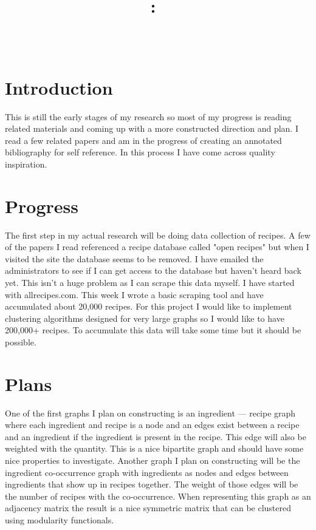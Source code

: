 \documentclass{article}
\title{
    \vspace{2in}
    \textmd{\textbf{\hmwkClass:\ \hmwkTitle}}\\
    \normalsize\vspace{0.1in}\small{\hmwkDueDate}\\
    \vspace{0.1in}\large{\textit{\hmwkClassInstructor}}
    \vspace{3in}
}
\author{\hmwkAuthorName}
\date{}
\begin{document}
\maketitle
\pagebreak

\section{Introduction}
This is still the early stages of my research so most of my progress is reading related materials and coming up with a more constructed direction and plan. I read a few related papers and am in the progress of creating an annotated bibliography for self reference. In this process I have come across quality inspiration.

\section{Progress}
The first step in my actual research will be doing data collection of recipes. A few of the papers I read referenced a recipe database called "open recipes" but when I visited the site the database seems to be removed. I have emailed the administrators to see if I can get access to the database but haven't heard back yet. This isn't a huge problem as I can scrape this data myself. I have started with allrecipes.com. This week I wrote a basic scraping tool and have accumulated about 20,000 recipes. For this project I would like to implement clustering algorithms designed for very large graphs so I would like to have 200,000+ recipes. To accumulate this data will take some time but it should be possible.

\section{Plans}
One of the first graphs I plan on constructing is an ingredient --- recipe graph where each ingredient and recipe is a node and an edges exist between a recipe and an ingredient if the ingredient is present in the recipe. This edge will also be weighted with the quantity. This is a nice bipartite graph and should have some nice properties to investigate. Another graph I plan on constructing will be the ingredient co-occurrence graph with ingredients as nodes and edges between ingredients that show up in recipes together. The weight of those edges will be the number of recipes with the co-occurrence. When representing this graph as an adjacency matrix the result is a nice symmetric matrix that can be clustered using modularity functionals.
\end{document}
